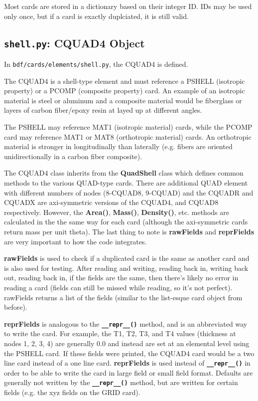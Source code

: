      Most cards are stored in a dictionary based on their integer ID.  IDs may be used only once, but if a card is exactly duplciated, it is still valid.

 \subsection{{\tt shell.py}: CQUAD4 Object}
     In {\tt bdf/cards/elements/shell.py}, the CQUAD4 is defined.
     
     The CQUAD4 is a shell-type element and must reference a PSHELL (isotropic property) or a PCOMP (composite property) card.  An example of an isotropic material is steel or aluminum and a composite material would be fiberglass or layers of carbon fiber/epoxy resin at layed up at different angles.
     
     The PSHELL may reference MAT1 (isotropic material) cards, while the PCOMP card may reference MAT1 or MAT8 (orthotropic material) cards.  An orthotropic material is stronger in longitudinally than laterally (e.g. fibers are oriented unidirectionally in a carbon fiber composite).
     
     The CQUAD4 class inherits from the {\bf QuadShell} class which defines common methods to the various QUAD-type cards.  There are additional QUAD element with different numbers of nodes (8-CQUAD8, 9-CQUAD) and the CQUADR and CQUADX are axi-symmetric versions of the CQUAD4, and CQUAD8 respectively.  However, the {\bf Area()}, {\bf Mass()}, {\bf Density()}, etc. methods are calculated in the the same way for each card (although the axi-symmetric cards return mass per unit theta).  The last thing to note is {\bf rawFields} and {\bf reprFields} are very important to how the code integrates.
     
     {\bf rawFields} is used to check if a duplicated card is the same as another card and is also used for testing.  After reading and writing, reading back in, writing back out, reading back in, if the fields are the 
     same, then there's likely no error in reading a card (fields can still be missed while reading, so it's not perfect).  rawFields returns a list of the fields (similar to the list-esque card object from before).
     
     {\bf reprFields} is analogous to the {\bf \tt \_\_repr\_\_()} method, and is an abbreviated way to write the card.  For example, the T1, T2, T3, and T4 values (thickness at nodes 1, 2, 3, 4) are generally 0.0 and instead are set at an elemental level using the PSHELL card.  If these fields were printed, the CQUAD4 card would be a two line card instead of a one line card.  {\bf reprFields} is used instead of {\bf \tt \_\_repr\_\_()} in order to be able to write the card in large field or small field format.  Defaults are generally not written by the {\bf \tt \_\_repr\_\_()} method, but are written for certain fields (e.g. the xyz fields on the GRID card).
    
